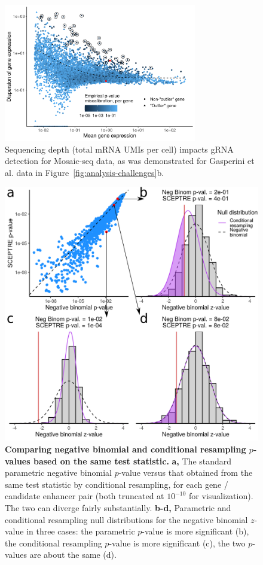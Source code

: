 \documentclass{nature}
\begin{document}
\begin{figure}[h!]
	\centering
	\includegraphics[width = 0.75\textwidth]{figures/FigureS1/FigureS1.png}
	\caption{Sequencing depth (total mRNA UMIs per cell) impacts gRNA detection for Mosaic-seq data\cite{Xie2017}, as was demonstrated for Gasperini et al. data in Figure~\ref{fig:analysis-challenges}b.}
	\label{fig:mosaicseq}
\end{figure}

\clearpage

\thispagestyle{empty} 
\begin{figure}[h!]
	\includegraphics[width = \textwidth]{figures/FigureS2/FigureS2.png}
	\caption{\textbf{Comparing negative binomial and conditional resampling $p$-values based on the same test statistic.} \textbf{a,} The standard parametric negative binomial $p$-value versus that obtained from the same test statistic by conditional resampling, for each gene / candidate enhancer pair (both truncated at $10^{-10}$ for visualization). The two can diverge fairly substantially. \textbf{b-d,} Parametric and conditional resampling null distributions for the negative binomial $z$-value in three cases: the parametric $p$-value is more significant (b), the conditional resampling $p$-value is more significant (c), the two $p$-values are about the same (d).}
	\label{fig:NB-vs-CP}
\end{figure}
\end{document}
